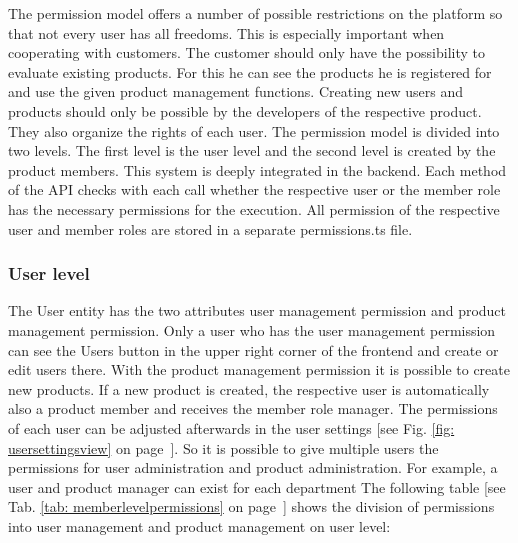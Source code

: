 


    The permission model offers a number of possible restrictions on the platform so that not every user has all freedoms. This is especially important when cooperating with customers. The customer should only have the possibility to evaluate existing products. For this he can see the products he is registered for and use the given product management functions. Creating new users and products should only be possible by the developers of the respective product. They also organize the rights of each user. The permission model is divided into two levels. The first level is the user level and the second level is created by the product members. This system is deeply integrated in the backend. Each method of the API checks with each call whether the respective user or the member role has the necessary permissions for the execution. All permission of the respective user and member roles are stored in a separate permissions.ts file. 

    \subsubsection*{User level}
    The User entity has the two attributes user management permission and product management permission. Only a user who has the user management permission can see the Users button in the upper right corner of the frontend and create or edit users there. With the product management permission it is possible to create new products. If a new product is created, the respective user is automatically also a product member and receives the member role manager. The permissions of each user can be adjusted afterwards in the user settings [see Fig. \ref{fig: usersettingsview} on page~\pageref{fig: usersettingsview}]. So it is possible to give multiple users the permissions for user administration and product administration. For example, a user and product manager can exist for each department The following table [see Tab. \ref{tab: memberlevelpermissions} on page~\pageref{tab: memberlevelpermissions}] shows the division of permissions into user management and product management on user level:

